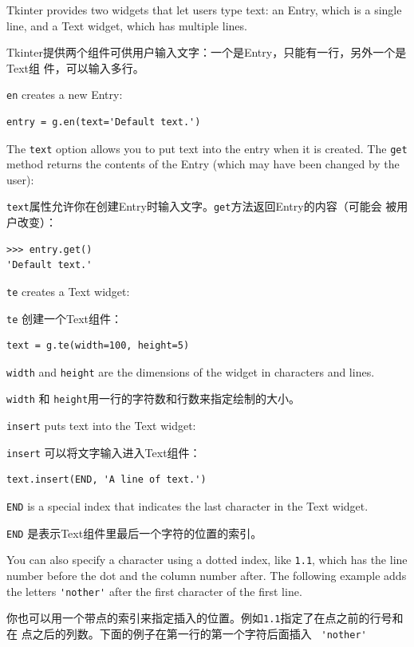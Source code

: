 \documentclass[10pt]{book}
\begin{document}
\begin{CJK}{UTF8}{gbsn}
Tkinter provides two widgets that let users type text: an
Entry, which is a single line, and a Text widget, which has
multiple lines.

Tkinter提供两个组件可供用户输入文字：一个是Entry，只能有一行，另外一个是Text组
件，可以输入多行。

{\tt en} creates a new Entry:

\begin{verbatim}
entry = g.en(text='Default text.')
\end{verbatim}
%
The {\tt text} option allows you to put text into the entry
when it is created.  The {\tt get} method returns the contents
of the Entry (which may have been changed by the user):

{\tt text}属性允许你在创建Entry时输入文字。{\tt get}方法返回Entry的内容（可能会
被用户改变）：

\begin{verbatim}
>>> entry.get()
'Default text.'
\end{verbatim}
%
{\tt te} creates a Text widget:

{\tt te} 创建一个Text组件：

\begin{verbatim}
text = g.te(width=100, height=5)
\end{verbatim}
%
{\tt width} and {\tt height} are the dimensions of the
widget in characters and lines.

{\tt width} 和 {\tt height}用一行的字符数和行数来指定绘制的大小。

{\tt insert} puts text into the Text widget:

{\tt insert} 可以将文字输入进入Text组件：

\begin{verbatim}
text.insert(END, 'A line of text.')
\end{verbatim}
%
{\tt END} is a special index that indicates the last character in the
Text widget.

{\tt END} 是表示Text组件里最后一个字符的位置的索引。

You can also specify a character using a dotted index, like {\tt 1.1},
which has the line number before the dot and the column number after.
The following example adds the letters \verb"'nother'" after the first
character of the first line.

你也可以用一个带点的索引来指定插入的位置。例如{\tt 1.1}指定了在点之前的行号和在
点之后的列数。下面的例子在第一行的第一个字符后面插入 \verb" 'nother' "


\end{CJK}
\end{document}
